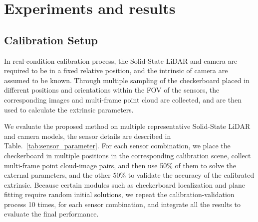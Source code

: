 \documentclass[journal]{vgtc}
\begin{document}
\section{Experiments and results}

\subsection{Calibration Setup}
In real-condition calibration process, the Solid-State LiDAR and camera are required to be in a fixed relative position, and the intrinsic of camera are assumed to be known. Through multiple sampling of the checkerboard placed in different positions and orientations within the FOV of the sensors, the corresponding images and multi-frame point cloud are collected, and are then used to calculate the extrinsic parameters.

We evaluate the proposed method on multiple representative Solid-State LiDAR and camera models, the sensor details are described in Table.~\ref{tab:sensor_parameter}. For each sensor combination, we place the checkerboard in multiple positions in the corresponding calibration scene, collect multi-frame point cloud-image pairs, and then use 50\% of them to solve the external parameters, and the other 50\% to validate the accuracy of the calibrated extrinsic. Because certain modules such as checkerboard localization and plane fitting require random initial solutions, we repeat the calibration-validation process 10 times, for each sensor combination, and integrate all the results to evaluate the final performance.
\end{document}
